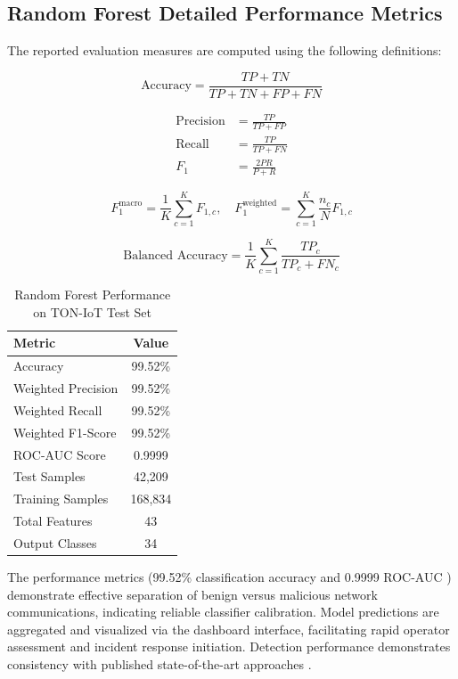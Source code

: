 \documentclass[conference]{IEEEtran}
\begin{document}
\subsection{Random Forest Detailed Performance Metrics}

The reported evaluation measures are computed using the following definitions:

\begin{equation}
\text{Accuracy} = \frac{TP + TN}{TP + TN + FP + FN}
\end{equation}

\begin{align}
\text{Precision} &= \frac{TP}{TP + FP} \\
\text{Recall} &= \frac{TP}{TP + FN} \\
F_1 &= \frac{2PR}{P + R}
\end{align}

\begin{equation}
F_1^{\text{macro}} = \frac{1}{K} \sum_{c=1}^{K} F_{1,c}, \quad
F_1^{\text{weighted}} = \sum_{c=1}^{K} \frac{n_c}{N} F_{1,c}
\end{equation}

\begin{equation}
\text{Balanced Accuracy} = \frac{1}{K} \sum_{c=1}^{K} \frac{TP_c}{TP_c + FN_c}
\end{equation}

\begin{table}[h]
\caption{Random Forest Performance on TON-IoT Test Set}
\label{tab:rf_metrics}
\centering
\begin{tabular}{|l|c|}
\hline
\textbf{Metric} & \textbf{Value} \\
\hline
Accuracy & 99.52\% \\
\hline
Weighted Precision & 99.52\% \\
\hline
Weighted Recall & 99.52\% \\
\hline
Weighted F1-Score & 99.52\% \\
\hline
ROC-AUC Score & 0.9999 \\
\hline
Test Samples & 42,209 \\
\hline
Training Samples & 168,834 \\
\hline
Total Features & 43 \\
\hline
Output Classes & 34 \\
\hline
\end{tabular}
\end{table}

The performance metrics (99.52\% classification accuracy and 0.9999 ROC-AUC \cite{b23}) demonstrate effective separation of benign versus malicious network communications, indicating reliable classifier calibration. Model predictions are aggregated and visualized via the dashboard interface, facilitating rapid operator assessment and incident response initiation. Detection performance demonstrates consistency with published state-of-the-art approaches \cite{b6, b7}.
\end{document}
